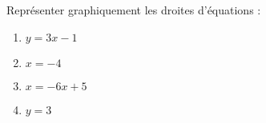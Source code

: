 
\begin{exercice}\label{exosmath-0607}

    Représenter graphiquement les droites d'équations :
    \begin{multicols}{2}
        \begin{enumerate}
            \item
                \( y=3x-1\)
            \item
                \( x=-4\)
            \item
                \( x=-6x+5\)
            \item
                \( y=3\)
        \end{enumerate}
    \end{multicols}

\end{exercice}
